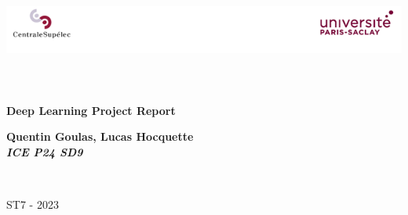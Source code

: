 \begin{titlepage}
\begin{center}

\includegraphics[width=\textwidth]{./logo}~\\[1cm]


\textsc{\Large }\\[0.5cm]

\HRule \\[0.4cm]

{\huge \bfseries Deep Learning Project Report\\
[0.4cm] }

{\large \bfseries Quentin Goulas, Lucas Hocquette\\[0.4cm] }
{\large \bfseries \textit{ICE P24 SD9}\\[0.4cm] }


\HRule \\[1.5cm]

\vspace{3cm}

%


\vfill

{\large ST7 - 2023}

\end{center}
\end{titlepage}